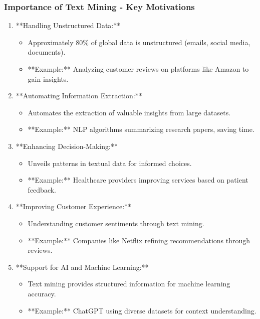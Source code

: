 \documentclass[aspectratio=169]{beamer}
\begin{document}
\begin{frame}[fragile]
    \frametitle{Importance of Text Mining - Key Motivations}
    
    \begin{enumerate}
        \item **Handling Unstructured Data:**
            \begin{itemize}
                \item Approximately 80\% of global data is unstructured (emails, social media, documents).
                \item **Example:** Analyzing customer reviews on platforms like Amazon to gain insights.
            \end{itemize}
    
        \item **Automating Information Extraction:**
            \begin{itemize}
                \item Automates the extraction of valuable insights from large datasets.
                \item **Example:** NLP algorithms summarizing research papers, saving time.
            \end{itemize}
        
        \item **Enhancing Decision-Making:**
            \begin{itemize}
                \item Unveils patterns in textual data for informed choices.
                \item **Example:** Healthcare providers improving services based on patient feedback.
            \end{itemize}
    
        \item **Improving Customer Experience:**
            \begin{itemize}
                \item Understanding customer sentiments through text mining.
                \item **Example:** Companies like Netflix refining recommendations through reviews.
            \end{itemize}
    
        \item **Support for AI and Machine Learning:**
            \begin{itemize}
                \item Text mining provides structured information for machine learning accuracy.
                \item **Example:** ChatGPT using diverse datasets for context understanding.
            \end{itemize}
    \end{enumerate}
\end{frame}
\end{document}
